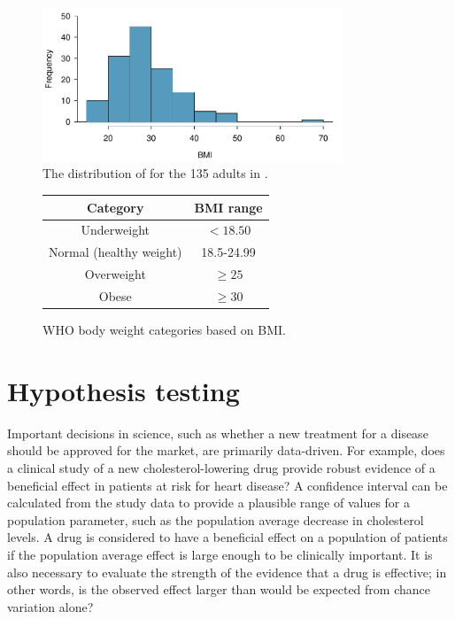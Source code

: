 \begin{figure}[h]
		\centering
		\includegraphics[width=0.8\textwidth]{ch_inference_foundations_oi_biostat/figures/nhanesAdultBmiHist/nhanesAdultBmiHist.pdf}
		\caption{The distribution of  for the 135 adults in .}
		\label{nhanesAdultBmiHist}
\end{figure}
	
\begin{figure}[h]
	\begin{center}
		\begin{tabular}{|c|c|}
			\hline 
			Category & BMI range\tabularnewline
			\hline 
			\hline 
			Underweight & $<18.50$\tabularnewline
			\hline 
			Normal (healthy weight) & 18.5-24.99\tabularnewline
			\hline 
			Overweight & $\geq 25$\tabularnewline
			\hline 
			Obese & $\geq30$\tabularnewline
			\hline
		\end{tabular}
		\caption{WHO body weight categories based on BMI.} 
		\label{whoBmiGuidelines}
	\end{center}
\end{figure}



\section[Hypothesis testing]{Hypothesis testing} %
\label{hypothesisTesting}


Important decisions in science, such as whether a new treatment for a disease should be approved for the market, are primarily data-driven. For example, does a clinical study of a new cholesterol-lowering drug provide robust evidence of a beneficial effect in patients at risk for heart disease? A confidence interval can be calculated from the study data to provide a plausible range of values for a population parameter, such as the population average decrease in cholesterol levels. A drug is considered to have a beneficial effect on a population of patients if the population average effect is large enough to be clinically important. It is also necessary to evaluate the strength of the evidence that a drug is effective; in other words, is the observed effect larger than would be expected from chance variation alone?


